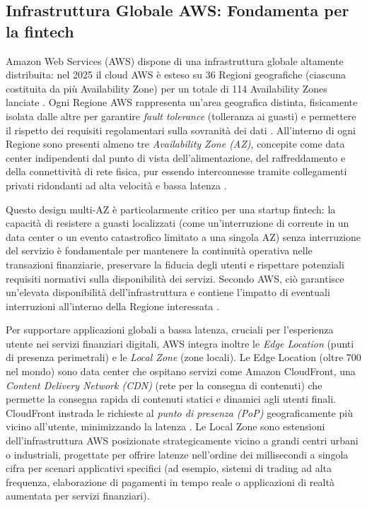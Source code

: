 \subsection{Infrastruttura Globale AWS: Fondamenta per la fintech}
\label{sec:aws-global-infra-fintech}

Amazon Web Services (AWS) dispone di una infrastruttura globale altamente distribuita: nel 2025 il cloud AWS è esteso su 36 Regioni geografiche (ciascuna costituita da più Availability Zone) per un totale di 114 Availability Zones lanciate \cite{aws-global-infra}. Ogni Regione AWS rappresenta un'area geografica distinta, fisicamente isolata dalle altre per garantire \textit{fault tolerance} (tolleranza ai guasti) e permettere il rispetto dei requisiti regolamentari sulla sovranità dei dati \cite{aws-global-infra}. All'interno di ogni Regione sono presenti almeno tre \textit{Availability Zone (AZ)}, concepite come data center indipendenti dal punto di vista dell'alimentazione, del raffreddamento e della connettività di rete fisica, pur essendo interconnesse tramite collegamenti privati ridondanti ad alta velocità e bassa latenza \cite{aws-global-infra}.

Questo design multi-AZ è particolarmente critico per una startup fintech: la capacità di resistere a guasti localizzati (come un'interruzione di corrente in un data center o un evento catastrofico limitato a una singola AZ) senza interruzione del servizio è fondamentale per mantenere la continuità operativa nelle transazioni finanziarie, preservare la fiducia degli utenti e rispettare potenziali requisiti normativi sulla disponibilità dei servizi. Secondo AWS, ciò garantisce un'elevata disponibilità dell'infrastruttura e contiene l'impatto di eventuali interruzioni all'interno della Regione interessata \cite{aws-global-infra}.

Per supportare applicazioni globali a bassa latenza, cruciali per l'esperienza utente nei servizi finanziari digitali, AWS integra inoltre le \textit{Edge Location} (punti di presenza perimetrali) e le \textit{Local Zone} (zone locali). Le Edge Location (oltre 700 nel mondo) sono data center che ospitano servizi come Amazon CloudFront, una \textit{Content Delivery Network (CDN)} (rete per la consegna di contenuti) che permette la consegna rapida di contenuti statici e dinamici agli utenti finali. CloudFront instrada le richieste al \textit{punto di presenza (PoP)} geograficamente più vicino all'utente, minimizzando la latenza \cite{aws-cloudfront}. Le Local Zone sono estensioni dell'infrastruttura AWS posizionate strategicamente vicino a grandi centri urbani o industriali, progettate per offrire latenze nell'ordine dei millisecondi a singola cifra per scenari applicativi specifici (ad esempio, sistemi di trading ad alta frequenza, elaborazione di pagamenti in tempo reale o applicazioni di realtà aumentata per servizi finanziari).

